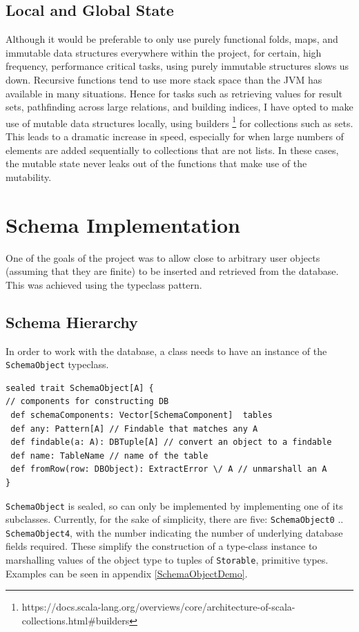 \documentclass[12pt,a4paper,twoside,openright]{report}
\newcommand\codeName[1]{\texttt{#1}}
\renewcommand{\baselinestretch}{1.1}    %
\begin{document}
	
	\subsection{Local and Global State}
Although it would be preferable to only use purely functional folds, maps, and immutable data structures everywhere within the project, for certain, high frequency, performance critical tasks, using purely immutable structures slows us down. Recursive functions tend to use more stack space than the JVM has available in many situations. Hence for tasks such as retrieving values for result sets,  pathfinding across large relations, and building indices, I have opted to make use of mutable data structures locally, using builders \footnote{https://docs.scala-lang.org/overviews/core/architecture-of-scala-collections.html\#builders} for collections such as sets. This leads to a dramatic increase in speed, especially for when large numbers of elements are added sequentially to collections that are not lists. In these cases, the mutable state never leaks out of the functions that make use of the mutability.	
	
\section{Schema Implementation}
	One of the goals of the project was to allow close to arbitrary user objects (assuming that they are finite) to be inserted and retrieved from the database. This was achieved using the typeclass pattern.
	\subsection{Schema Hierarchy}
	In order to work with the database, a class needs to have an instance of the \codeName{SchemaObject} typeclass.

\renewcommand{\baselinestretch}{0.8}
	\begin{framed}
		\begin{verbatim}
sealed trait SchemaObject[A] {
// components for constructing DB
 def schemaComponents: Vector[SchemaComponent]  tables
 def any: Pattern[A] // Findable that matches any A
 def findable(a: A): DBTuple[A] // convert an object to a findable
 def name: TableName // name of the table
 def fromRow(row: DBObject): ExtractError \/ A // unmarshall an A
}
		\end{verbatim}
	\end{framed}
\renewcommand{\baselinestretch}{1.1}
	
	\codeName{SchemaObject} is sealed, so can only be implemented by implementing one of its subclasses. Currently, for the sake of simplicity, there are five: \codeName{SchemaObject0} .. \codeName{SchemaObject4}, with the number indicating the number of underlying database fields required. These simplify the construction of a type-class instance to marshalling values of the object type to tuples of  \codeName{Storable}, primitive types. Examples can be seen in appendix \ref{SchemaObjectDemo}.
	
\end{document}
